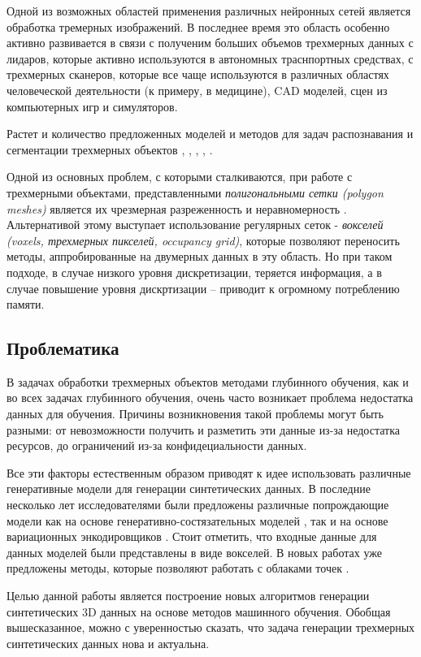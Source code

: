 Одной из возможных областей применения различных нейронных сетей является обработка тремерных изображений. В последнее время это область особенно активно развивается в связи с полученим больших объемов трехмерных данных с лидаров, которые активно используются в автономных траснпортных средствах, с трехмерных сканеров, которые все чаще используются в различных областях человеческой деятельности (к примеру, в медицине), CAD моделей, сцен из компьютерных игр и симуляторов.


Растет и количество предложенных моделей и методов для задач распознавания и сегментации трехмерных объектов \cite{point-net-plus}, \cite{seg-cloud}, \cite{octree-based}, \cite{spherical-conv-1}, \cite{spherical-cnn}.


Одной из основных проблем, с которыми сталкиваются, при работе с трехмерными объектами, представленными \textit{полигональными сетки (polygon meshes)} является их чрезмерная разреженность и неравномерность \cite{pu-net}. Альтернативой этому выступает использование регулярных сеток - \textit{вокселей (voxels, трехмерных пикселей, occupancy grid)}, которые позволяют переносить методы, аппробированные на двумерных данных в эту область. Но при таком подходе, в случае низкого уровня дискретизации, теряется информация, а в случае повышение уровня дискртизации -- приводит к огромному потреблению памяти. 


\subsection{Проблематика}

В задачах обработки трехмерных объектов методами глубинного обучения, как и во всех задачах глубинного обучения, очень часто возникает проблема недостатка данных для обучения. Причины возникновения такой проблемы могут быть разными: от невозможности получить и разметить эти данные из-за недостатка ресурсов, до ограничений из-за конфидециальности данных.

Все эти факторы естественным образом приводят к идее использовать различные генеративные модели для генерации синтетических данных. В последние несколько лет исследователями были предложены различные попрождающие модели как на основе генеративно-состязательных моделей \cite{3d-gan}, так и на основе вариационных энкодировщиков \cite{3d-autoencoder}. Стоит отметить, что входные данные для данных моделей были представлены в виде  вокселей. В новых работах уже предложены методы, которые позволяют работать с облаками точек \cite{adversarial-autoencoder}. 

Целью данной работы является построение новых алгоритмов генерации синтетических 3D данных на основе методов машинного обучения. Обобщая вышесказанное, можно с уверенностью сказать, что задача генерации трехмерных синтетических данных нова и актуальна. 
